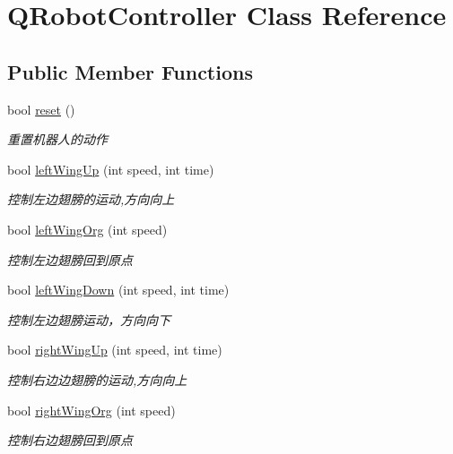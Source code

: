\hypertarget{classQRobotController}{\section{\-Q\-Robot\-Controller \-Class \-Reference}
\label{classQRobotController}
}
\subsection*{\-Public \-Member \-Functions}
\begin{DoxyCompactItemize}
\item 
bool \hyperlink{classQRobotController_ad97e06a8e50a161fd1d517cd8d5c0b28}{reset} ()
\begin{DoxyCompactList}\small\item\em 重置机器人的动作 \end{DoxyCompactList}\item 
bool \hyperlink{classQRobotController_a82fc8edefafcd6b7a61abf9999f7000e}{left\-Wing\-Up} (int speed, int time)
\begin{DoxyCompactList}\small\item\em 控制左边翅膀的运动,方向向上 \end{DoxyCompactList}\item 
bool \hyperlink{classQRobotController_a3dfb9605e6c136ce9048f117ef36574c}{left\-Wing\-Org} (int speed)
\begin{DoxyCompactList}\small\item\em 控制左边翅膀回到原点 \end{DoxyCompactList}\item 
bool \hyperlink{classQRobotController_a21577c882cd6999f54bac238141aa9c1}{left\-Wing\-Down} (int speed, int time)
\begin{DoxyCompactList}\small\item\em 控制左边翅膀运动，方向向下 \end{DoxyCompactList}\item 
bool \hyperlink{classQRobotController_ab9975cee1d87bc7fd03604b5b4e5c4be}{right\-Wing\-Up} (int speed, int time)
\begin{DoxyCompactList}\small\item\em 控制右边边翅膀的运动,方向向上 \end{DoxyCompactList}\item 
bool \hyperlink{classQRobotController_a1afc24cae5b6782e8cffb0074b868cd4}{right\-Wing\-Org} (int speed)
\begin{DoxyCompactList}\small\item\em 控制右边翅膀回到原点 \end{DoxyCompactList}\item 

\end{DoxyCompactItemize}

